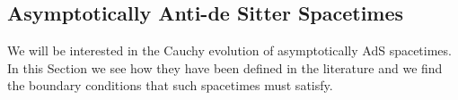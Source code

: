 \documentclass[12pt]{iopart} %
\begin{document}
\subsection{Asymptotically Anti-de Sitter Spacetimes}\label{subsec:asyAdS}

We will be interested in the Cauchy evolution of asymptotically AdS spacetimes. In this Section we see how they have been defined in the literature and we find the boundary conditions that such spacetimes must satisfy.



\end{document}
